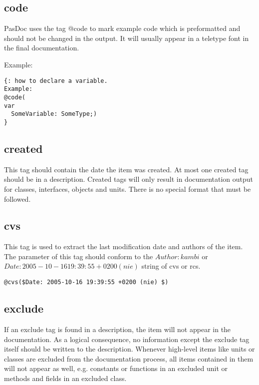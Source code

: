 \documentclass[11pt]{article}
\begin{document}
\subsection{code}

PasDoc uses the tag @code to mark example code which is preformatted and should 
not be changed in the output. It will usually appear in a teletype font in
the final documentation.

Example:
\begin{verbatim}
{: how to declare a variable.
Example:
@code(
var
  SomeVariable: SomeType;)
}
\end{verbatim}


\subsection{created}

This tag should contain the date the item was created.
At most one created tag should be in a description.
Created tags will only result in documentation output for
classes, interfaces, objects and units.
There is no special format that must be followed.

\subsection{cvs}

This tag is used to extract the last modification
date and authors of the item. The parameter of this
tag should conform to the $Author: kambi $ or $Date: 2005-10-16 19:39:55 +0200 (nie) $ string
of cvs or rcs.

\begin{verbatim}
@cvs($Date: 2005-10-16 19:39:55 +0200 (nie) $)
\end{verbatim}

\subsection{exclude}

If an exclude tag is found in a description, the item will not
appear in the documentation.
As a logical consequence, no information except the
exclude tag itself should be written to the description.
Whenever high-level items like units or classes are excluded from the
documentation process, all items contained in them will not appear as well,
e.g. constants or functions in an excluded unit or methods and fields in
an excluded class.
\end{document}
